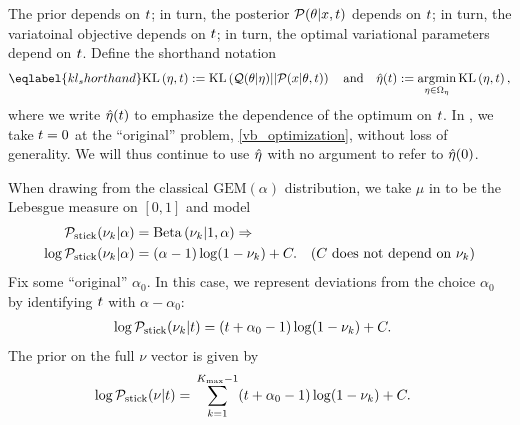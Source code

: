 The prior depends on $t$; in turn, the posterior $\mathcal{P}(\theta \vert x, t)$
depends on $t$; in turn, the variatoinal objective depends on $t$; in turn, the
optimal variational parameters depend on $t$.  Define the shorthand notation
%
\begin{align}\eqlabel{kl_shorthand}
%
\KL{\eta, \t} := \KL{\q(\theta \vert \eta) || \p(\x \vert \theta, \t)}
\mathand
\etaopt(\t) := \argmin_{\eta \in \etadom} \KL{\eta, \t},
%
\end{align}
%
where we write $\hat\eta(t)$ to emphasize the dependence of the optimum on $t$.
In , we take $t = 0$ at the ``original'' problem,
\eqref{vb_optimization}, without loss of generality.  We will thus continue to
use $\hat\eta$ with no argument to refer to $\hat\eta(0)$.


\begin{ex}
%
When drawing from the classical $\mathrm{GEM}(\alpha)$ distribution, we take
$\mu$ in  to be the Lebesgue measure on $[0,1]$ and model
%
\begin{align*}
%
\pstick(\nuk \vert \alpha) ={}&
    \betadist{\nuk \vert 1, \alpha} \Rightarrow\\
\log \pstick(\nuk \vert \alpha) ={}&
    (\alpha - 1) \log(1 - \nuk) + \const. &
    \constdesc{\nuk}
%
\end{align*}
%
Fix some ``original'' $\alpha_0$.  In this case, we represent deviations from
the choice $\alpha_0$ by identifying $t$ with $\alpha - \alpha_0$:
%
\begin{align*}
%
\log \pstick(\nuk \vert \t) ={}&
(\t + \alpha_0 - 1) \log(1 - \nuk) + \const.
\end{align*}
%
The prior on the full $\nu$ vector is given by
%
\begin{align*}
%
\log \pstick(\nu \vert \t) ={}&
    \sumkm (t + \alpha_0 - 1) \log(1 - \nuk)+ \const.
%
\end{align*}
%
\end{ex}
